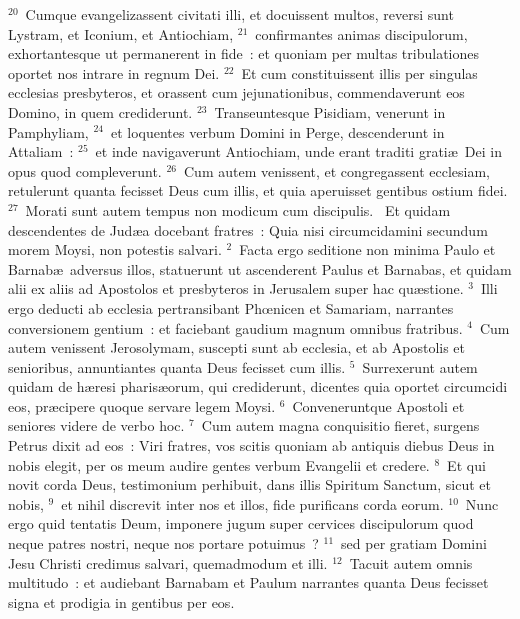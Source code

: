 ${}^{20}$~Cumque evangelizassent civitati illi, et docuissent multos, reversi sunt Lystram, et Iconium, et Antiochiam,
${}^{21}$~confirmantes animas discipulorum, exhortantesque ut permanerent in fide~: et quoniam per multas tribulationes oportet nos intrare in regnum Dei.
${}^{22}$~Et cum constituissent illis per singulas ecclesias presbyteros, et orassent cum jejunationibus, commendaverunt eos Domino, in quem crediderunt.
${}^{23}$~Transeuntesque Pisidiam, venerunt in Pamphyliam,
${}^{24}$~et loquentes verbum Domini in Perge, descenderunt in Attaliam~:
${}^{25}$~et inde navigaverunt Antiochiam, unde erant traditi grati\ae\ Dei in opus quod compleverunt.
${}^{26}$~Cum autem venissent, et congregassent ecclesiam, retulerunt quanta fecisset Deus cum illis, et quia aperuisset gentibus ostium fidei.
${}^{27}$~Morati sunt autem tempus non modicum cum discipulis.
~\lettrine[lines=10,image=true,loversize=0.05,lraise=-0.03]{E}{}t quidam descendentes de Jud\ae a docebant fratres~: Quia nisi circumcidamini secundum morem Moysi, non potestis salvari.
${}^{2}$~Facta ergo seditione non minima Paulo et Barnab\ae\ adversus illos, statuerunt ut ascenderent Paulus et Barnabas, et quidam alii ex aliis ad Apostolos et presbyteros in Jerusalem super hac qu\ae stione.
${}^{3}$~Illi ergo deducti ab ecclesia pertransibant Phœnicen et Samariam, narrantes conversionem gentium~: et faciebant gaudium magnum omnibus fratribus.
${}^{4}$~Cum autem venissent Jerosolymam, suscepti sunt ab ecclesia, et ab Apostolis et senioribus, annuntiantes quanta Deus fecisset cum illis.
${}^{5}$~Surrexerunt autem quidam de h\ae resi pharis\ae orum, qui crediderunt, dicentes quia oportet circumcidi eos, pr\ae cipere quoque servare legem Moysi.
${}^{6}$~Conveneruntque Apostoli et seniores videre de verbo hoc.
${}^{7}$~Cum autem magna conquisitio fieret, surgens Petrus dixit ad eos~: Viri fratres, vos scitis quoniam ab antiquis diebus Deus in nobis elegit, per os meum audire gentes verbum Evangelii et credere.
${}^{8}$~Et qui novit corda Deus, testimonium perhibuit, dans illis Spiritum Sanctum, sicut et nobis,
${}^{9}$~et nihil discrevit inter nos et illos, fide purificans corda eorum.
${}^{10}$~Nunc ergo quid tentatis Deum, imponere jugum super cervices discipulorum quod neque patres nostri, neque nos portare potuimus~?
${}^{11}$~sed per gratiam Domini Jesu Christi credimus salvari, quemadmodum et illi.
${}^{12}$~Tacuit autem omnis multitudo~: et audiebant Barnabam et Paulum narrantes quanta Deus fecisset signa et prodigia in gentibus per eos.


